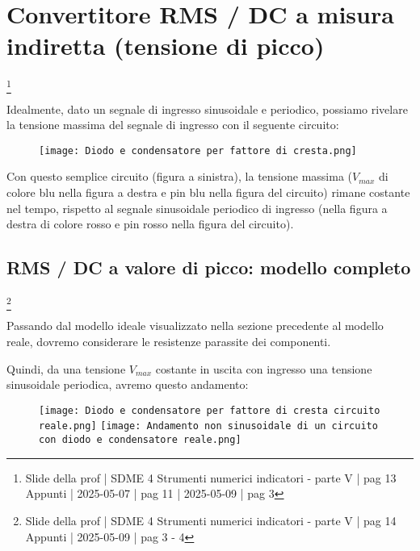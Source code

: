 \newpage 

\section{Convertitore RMS / DC a misura indiretta (tensione di picco)}
\footnote{Slide della prof | SDME 4 Strumenti numerici indicatori - parte V | pag 13\\  
Appunti | 2025-05-07 | pag 11 | 2025-05-09 | pag 3} 

Idealmente, dato un segnale di ingresso sinusoidale e periodico, 
possiamo rivelare la tensione massima del segnale di ingresso con il seguente circuito: 

\begin{figure}[h]
    \centering
    \texttt{[image: Diodo e condensatore per fattore di cresta.png]}
\end{figure}

Con questo semplice circuito (figura a sinistra), 
la tensione massima ($V_{max}$ di colore blu nella figura a destra e pin blu nella figura del circuito) rimane costante nel tempo, 
rispetto al segnale sinusoidale periodico di ingresso (nella figura a destra di colore rosso e pin rosso nella figura del circuito). \newline 


\newpage 

\subsection{RMS / DC a valore di picco: modello completo}
\footnote{Slide della prof | SDME 4 Strumenti numerici indicatori - parte V | pag 14\\  
Appunti | 2025-05-09 | pag 3 - 4} 

Passando dal modello ideale visualizzato nella sezione precedente al modello reale, 
dovremo considerare le resistenze parassite dei componenti. \newline 

Quindi, da una tensione $V_{max}$ costante in uscita con ingresso una tensione sinusoidale periodica, 
avremo questo andamento:  

\begin{figure}[h]
    \centering
    \texttt{[image: Diodo e condensatore per fattore di cresta circuito reale.png]}
    \texttt{[image: Andamento non sinusoidale di un circuito con diodo e condensatore reale.png]}
\end{figure}

